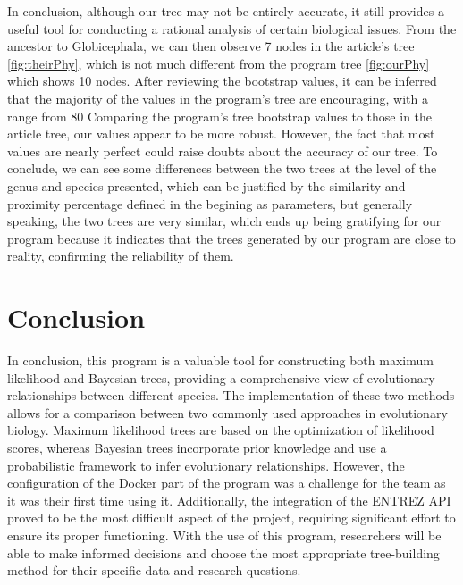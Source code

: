 \documentclass[12pt]{article}
\begin{document}
In conclusion, although our tree may not be entirely accurate, it still provides a useful tool for conducting a rational analysis of certain biological issues.\newline
From the ancestor to Globicephala, we can then observe 7 nodes in the article's tree \ref{fig:theirPhy}, which is not much different from the program tree \ref{fig:ourPhy} which shows 10 nodes.\newline
After reviewing the bootstrap values, it can be inferred that the majority of the values in the program's tree are encouraging, with a range from 80%
Comparing the program's tree bootstrap values to those in the article tree, our values appear to be more robust. However, the fact that most values are nearly perfect could raise doubts about the accuracy of our tree.\newline
To conclude, we can see some differences between the two trees at the level of the genus and species presented, which can be justified by the similarity and proximity percentage defined in the begining as parameters, but generally speaking, the two trees are very similar, which ends up being gratifying for our program because it indicates that the trees generated by our program are close to reality, confirming the reliability of them.
\newpage

\section{Conclusion}\label{sec:conclusoes}
In conclusion, this program is a valuable tool for constructing both maximum likelihood and Bayesian trees, providing a comprehensive view of evolutionary relationships between different species. The implementation of these two methods allows for a comparison between two commonly used approaches in evolutionary biology. Maximum likelihood trees are based on the optimization of likelihood scores, whereas Bayesian trees incorporate prior knowledge and use a probabilistic framework to infer evolutionary relationships. However, the configuration of the Docker part of the program was a challenge for the team as it was their first time using it. Additionally, the integration of the ENTREZ API proved to be the most difficult aspect of the project, requiring significant effort to ensure its proper functioning. With the use of this program, researchers will be able to make informed decisions and choose the most appropriate tree-building method for their specific data and research questions.
\end{document}
